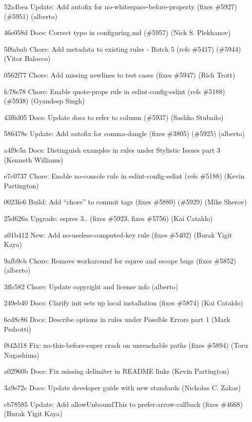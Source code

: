 \begin{DoxyItemize}
\item 52a4bea Update\+: Add autofix for {\ttfamily no-\/whitespace-\/before-\/property} (fixes \#5927) (\#5951) (alberto)
\item 46e058d Docs\+: Correct typo in configuring.\+md (\#5957) (Nick S. Plekhanov)
\item 5f8abab Chore\+: Add metadata to existing rules -\/ Batch 5 (refs \#5417) (\#5944) (Vitor Balocco)
\item 0562f77 Chore\+: Add missing newlines to test cases (fixes \#5947) (Rich Trott)
\item fc78e78 Chore\+: Enable quote-\/props rule in eslint-\/config-\/eslint (refs \#5188) (\#5938) (Gyandeep Singh)
\item 43f6d05 Docs\+: Update docs to refer to column (\#5937) (Sashko Stubailo)
\item 586478e Update\+: Add autofix for {\ttfamily comma-\/dangle} (fixes \#3805) (\#5925) (alberto)
\item a4f9c5a Docs\+: Distinguish examples in rules under Stylistic Issues part 3 (Kenneth Williams)
\item e7c0737 Chore\+: Enable no-\/console rule in eslint-\/config-\/eslint (refs \#5188) (Kevin Partington)
\item 0023fe6 Build\+: Add “chore” to commit tags (fixes \#5880) (\#5929) (Mike Sherov)
\item 25d626a Upgrade\+: espree 3.. (fixes \#5923, fixes \#5756) (Kai Cataldo)
\item a01b412 New\+: Add {\ttfamily no-\/useless-\/computed-\/key} rule (fixes \#5402) (Burak Yigit Kaya)
\item 9afb9cb Chore\+: Remove workaround for espree and escope bugs (fixes \#5852) (alberto)
\item 3ffc582 Chore\+: Update copyright and license info (alberto)
\item 249eb40 Docs\+: Clarify init sets up local installation (fixes \#5874) (Kai Cataldo)
\item 6cd8c86 Docs\+: Describe options in rules under Possible Errors part 1 (Mark Pedrotti)
\item f842d18 Fix\+: {\ttfamily no-\/this-\/before-\/super} crash on unreachable paths (fixes \#5894) (Toru Nagashima)
\item a02960b Docs\+: Fix missing delimiter in R\+E\+A\+D\+ME links (Kevin Partington)
\item 3a9e72c Docs\+: Update developer guide with new standards (Nicholas C. Zakas)
\item cb78585 Update\+: Add {\ttfamily allow\+Unbound\+This} to {\ttfamily prefer-\/arrow-\/callback} (fixes \#4668) (Burak Yigit Kaya)

\end{DoxyItemize}
